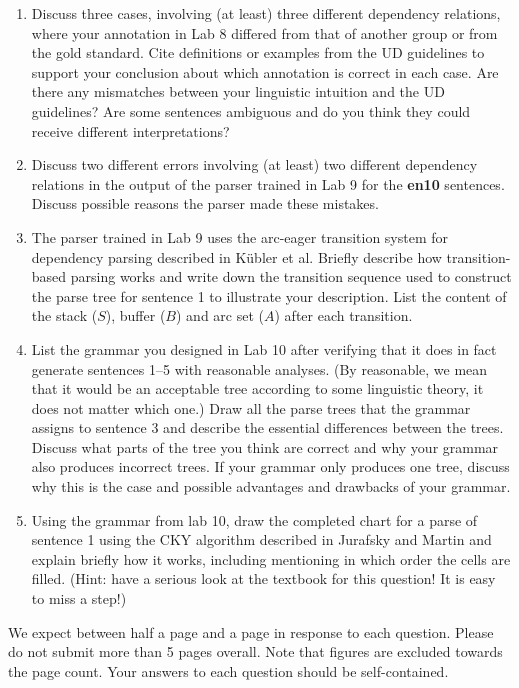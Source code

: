 \documentclass[11pt]{article}
\begin{document}
\begin{enumerate}[itemsep=3pt]
\item Discuss three cases, involving (at least) three different dependency relations, where your annotation in Lab 8 differed from that of another group or from the gold standard.  Cite definitions or examples from the UD guidelines to support your conclusion about which annotation is correct in each case. Are there any mismatches between your linguistic intuition and the UD guidelines? Are some sentences ambiguous and do you think they could receive different interpretations?
\item Discuss two different errors involving (at least) two different dependency relations in the output of the parser trained in Lab 9 for the \textbf{en10} sentences. Discuss possible reasons the parser made these mistakes.
\item The parser trained in Lab 9 uses the arc-eager transition system for dependency parsing described in K\"{u}bler et al. Briefly describe how transition-based parsing works and write down the transition sequence used to construct the parse tree for sentence 1 to illustrate your description. List the content of the stack ($S$), buffer ($B$) and arc set ($A$) after each transition. 
\item List the grammar you designed in Lab 10 after verifying that it does in fact generate sentences 1--5 with reasonable analyses. (By reasonable, we mean that it would be an acceptable tree according to some linguistic theory, it does not matter which one.) Draw all the parse trees that the grammar assigns to sentence 3 and describe the essential differences between the trees. Discuss what parts of the tree you think are correct and why your grammar also produces incorrect trees. If your grammar only produces one tree, discuss why this is the case and possible advantages and drawbacks of your grammar.
\item Using the grammar from lab 10, draw the completed chart for a parse of sentence 1 using the CKY algorithm described in Jurafsky and Martin and explain briefly how it works, including mentioning in which order the cells are filled. (Hint: have a serious look at the textbook for this question! It is easy to miss a step!) 
\end{enumerate}

We expect between half a page and a page in response to each question. Please do not submit more than 5 pages overall. 
Note that figures are excluded towards the page count.
Your answers to each question should be self-contained.
\end{document}
